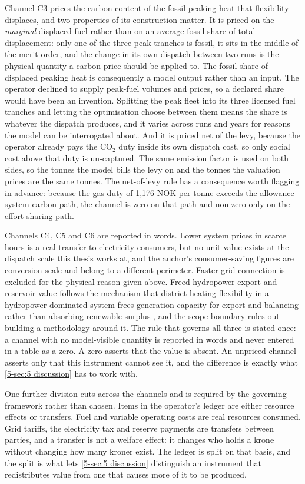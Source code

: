 Channel C3 prices the carbon content of the fossil peaking heat that flexibility displaces, and two properties of its construction matter. It is priced on the \emph{marginal} displaced fuel rather than on an average fossil share of total displacement: only one of the three peak tranches is fossil, it sits in the middle of the merit order, and the change in its own dispatch between two runs is the physical quantity a carbon price should be applied to. The fossil share of displaced peaking heat is consequently a model output rather than an input. The operator declined to supply peak-fuel volumes and prices, so a declared share would have been an invention. Splitting the peak fleet into its three licensed fuel tranches and letting the optimisation choose between them means the share is whatever the dispatch produces, and it varies across runs and years for reasons the model can be interrogated about. And it is priced net of the levy, because the operator already pays the CO$_2$ duty inside its own dispatch cost, so only social cost above that duty is un-captured. The same emission factor is used on both sides, so the tonnes the model bills the levy on and the tonnes the valuation prices are the same tonnes. The net-of-levy rule has a consequence worth flagging in advance: because the gas duty of 1,176 NOK per tonne exceeds the allowance-system carbon path, the channel is zero on that path and non-zero only on the effort-sharing path.

Channels C4, C5 and C6 are reported in words. Lower system prices in scarce hours is a real transfer to electricity consumers, but no unit value exists at the dispatch scale this thesis works at, and the anchor's consumer-saving figures are conversion-scale and belong to a different perimeter. Faster grid connection is excluded for the physical reason given above. Freed hydropower export and reservoir value follows the mechanism that district heating flexibility in a hydropower-dominated system frees generation capacity for export and balancing rather than absorbing renewable surplus \cite{askeland_balancing_2019}, and the scope boundary rules out building a methodology around it. The rule that governs all three is stated once: a channel with no model-visible quantity is reported in words and never entered in a table as a zero. A zero asserts that the value is absent. An unpriced channel asserts only that this instrument cannot see it, and the difference is exactly what \autoref{5-sec:5 discussion} has to work with.

One further division cuts across the channels and is required by the governing framework rather than chosen. Items in the operator's ledger are either resource effects or transfers. Fuel and variable operating costs are real resources consumed. Grid tariffs, the electricity tax and reserve payments are transfers between parties, and a transfer is not a welfare effect: it changes who holds a krone without changing how many kroner exist. The ledger is split on that basis, and the split is what lets \autoref{5-sec:5 discussion} distinguish an instrument that redistributes value from one that causes more of it to be produced.

